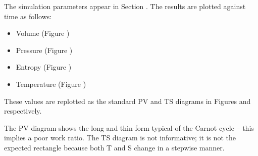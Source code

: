 The simulation parameters appear in Section
. The results are plotted against time
as follows:
\begin{itemize}
\item Volume (Figure )
\item Pressure (Figure
)
\item Entropy (Figure )
\item Temperature (Figure
)
\end{itemize}

These values are replotted as the standard PV and TS diagrams in
Figures
and
respectively.

The PV diagram shows the long and thin form typical of the Carnot
cycle -- this implies a poor work ratio. The TS diagram is not
informative; it is not the expected rectangle because both T and S
change in a stepwise manner.




